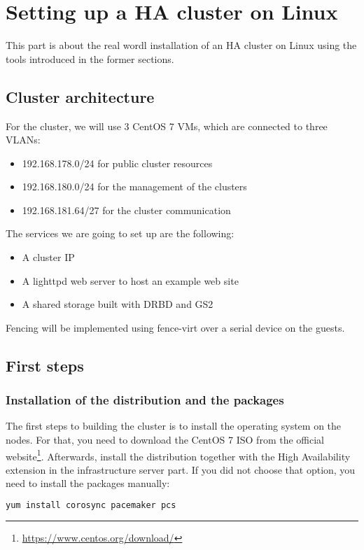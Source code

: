 \section{Setting up a HA cluster on Linux}
This part is about the real wordl installation of an \ac{HA} cluster on Linux using the tools introduced in the former sections.

\subsection{Cluster architecture}
For the cluster, we will use 3 CentOS 7 \acp{VM}, which are connected
to three \acp{VLAN}: 
\begin{itemize}
\item 192.168.178.0/24 for public cluster resources
\item 192.168.180.0/24 for the management of the clusters
\item 192.168.181.64/27 for the cluster communication
\end{itemize}
The services we are going to set up are the following:
\begin{itemize}
\item A cluster IP
\item A lighttpd web server to host an example web site
\item A shared storage built with DRBD and GS2
\end{itemize}

Fencing will be implemented using fence-virt over a serial device
on the guests.

\subsection{First steps}

\subsubsection{Installation of the distribution and the packages}
The first steps to building the cluster is to install the operating system on the nodes.
For that, you need to download the CentOS 7 ISO from the official website\footnote{\url{https://www.centos.org/download/}}.
Afterwards, install the distribution together with the High Availability extension
in the infrastructure server part.
If you did not choose that option, you need to install the packages manually:
\begin{lstlisting}[language=sh]
yum install corosync pacemaker pcs
\end{lstlisting}
